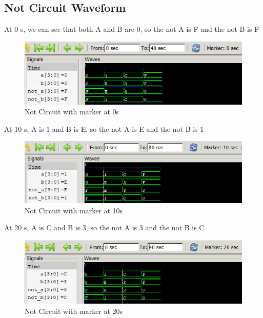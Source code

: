 \documentclass[12pt]{article}
\begin{document}
\subsection{Not Circuit Waveform}

At 0 s, we can see that both A and B are 0, so the not A is F and the not B is F
\begin{figure}[h]
    \centering
    \includegraphics[width = 1.0\textwidth]{figs/Not0.png}
    \caption{Not Circuit with marker at 0s}
    \label{fig:enter-label}
\end{figure}

\newpage

At 10 s, A is 1 and B is E, so the not A is E and the not B is 1
\begin{figure}[h]
    \centering
    \includegraphics[width = 1.0\textwidth]{figs/Not10.png}
    \caption{Not Circuit with marker at 10s}
    \label{fig:enter-label}
\end{figure}


At 20 s, A is C and B is 3, so the not A is 3 and the not B is C
\begin{figure}[h]
    \centering
    \includegraphics[width = 1.0\textwidth]{figs/Not20.png}
    \caption{Not Circuit with marker at 20s}
    \label{fig:enter-label}
\end{figure}
\end{document}
